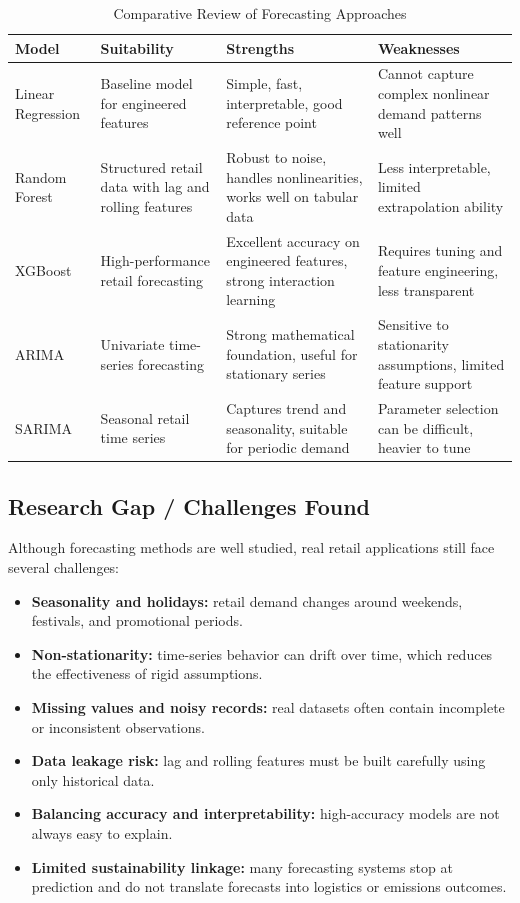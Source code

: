 \documentclass[12pt,a4paper]{article}
\begin{document}
\begin{table}[H]
\centering
\caption{Comparative Review of Forecasting Approaches}
\renewcommand{\arraystretch}{1.25}
\begin{tabular}{p{2.6cm} p{3.1cm} p{4.3cm} p{4.3cm}}
\toprule
\textbf{Model} & \textbf{Suitability} & \textbf{Strengths} & \textbf{Weaknesses} \\
\midrule
Linear Regression & Baseline model for engineered features & Simple, fast, interpretable, good reference point & Cannot capture complex nonlinear demand patterns well \\
Random Forest & Structured retail data with lag and rolling features & Robust to noise, handles nonlinearities, works well on tabular data & Less interpretable, limited extrapolation ability \\
XGBoost & High-performance retail forecasting & Excellent accuracy on engineered features, strong interaction learning & Requires tuning and feature engineering, less transparent \\
ARIMA & Univariate time-series forecasting & Strong mathematical foundation, useful for stationary series & Sensitive to stationarity assumptions, limited feature support \\
SARIMA & Seasonal retail time series & Captures trend and seasonality, suitable for periodic demand & Parameter selection can be difficult, heavier to tune \\
\bottomrule
\end{tabular}
\end{table}

\subsection{Research Gap / Challenges Found}
Although forecasting methods are well studied, real retail applications still face several challenges:
\begin{itemize}[leftmargin=*]
    \item \textbf{Seasonality and holidays:} retail demand changes around weekends, festivals, and promotional periods.
    \item \textbf{Non-stationarity:} time-series behavior can drift over time, which reduces the effectiveness of rigid assumptions.
    \item \textbf{Missing values and noisy records:} real datasets often contain incomplete or inconsistent observations.
    \item \textbf{Data leakage risk:} lag and rolling features must be built carefully using only historical data.
    \item \textbf{Balancing accuracy and interpretability:} high-accuracy models are not always easy to explain.
    \item \textbf{Limited sustainability linkage:} many forecasting systems stop at prediction and do not translate forecasts into logistics or emissions outcomes.
\end{itemize}
\end{document}
